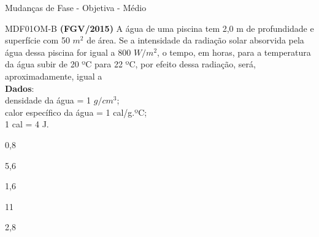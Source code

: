 \documentclass[12pt]{article}
\begin{document}
	\begin{quiz}{Mudanças de Fase - Objetiva - Médio}
		\begin{multi}[points=1,penalty=0]{MDF01OM-B}
			\textbf{(FGV/2015)} A água de uma piscina tem 2,0 m de profundidade e superfície com 50 $m^{2}$ de área. Se a intensidade da radiação solar absorvida pela água dessa piscina for igual a 800 $W/m^{2}$, o tempo, em horas, para a temperatura da água subir de 20 ºC para 22 ºC, por efeito dessa radiação, será, aproximadamente, igual a\\
			\textbf{Dados}:\\
			densidade da água = 1 $g/cm^{3}$;\\
			calor específico da água = 1 cal/g.ºC;\\
			1 cal = 4 J.								
			\item 0,8
			\item* 5,6
			\item 1,6
			\item 11
			\item 2,8
		\end{multi}
	

\end{quiz}
\end{document}
